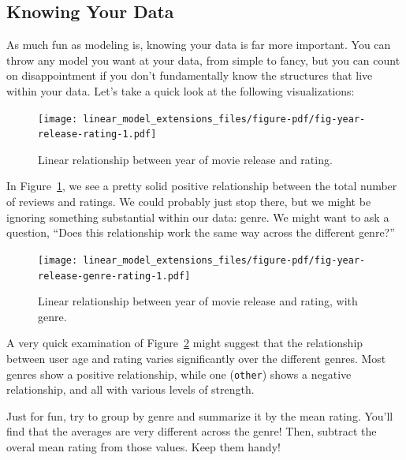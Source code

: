 \documentclass[
  letterpaper,
]{krantz}
\begin{document}
\subsection{Knowing Your Data}\label{knowing-your-data}

As much fun as modeling is, knowing your data is far more important. You
can throw any model you want at your data, from simple to fancy, but you
can count on disappointment if you don't fundamentally know the
structures that live within your data. Let's take a quick look at the
following visualizations:

\begin{figure}

{\centering \texttt{[image: linear\_model\_extensions\_files/figure-pdf/fig-year-release-rating-1.pdf]}

}

\caption{\label{fig-year-release-rating}Linear relationship between year
of movie release and rating.}

\end{figure}

In Figure~\ref{fig-year-release-rating}, we see a pretty solid positive
relationship between the total number of reviews and ratings. We could
probably just stop there, but we might be ignoring something substantial
within our data: genre. We might want to ask a question, ``Does this
relationship work the same way across the different genre?''

\begin{figure}

{\centering \texttt{[image: linear\_model\_extensions\_files/figure-pdf/fig-year-release-genre-rating-1.pdf]}

}

\caption{\label{fig-year-release-genre-rating}Linear relationship
between year of movie release and rating, with genre.}

\end{figure}

A very quick examination of Figure~\ref{fig-year-release-genre-rating}
might suggest that the relationship between user age and rating varies
significantly over the different genres. Most genres show a positive
relationship, while one (\texttt{other}) shows a negative relationship,
and all with various levels of strength.

Just for fun, try to group by genre and summarize it by the mean rating.
You'll find that the averages are very different across the genre! Then,
subtract the overal mean rating from those values. Keep them handy!
\end{document}
